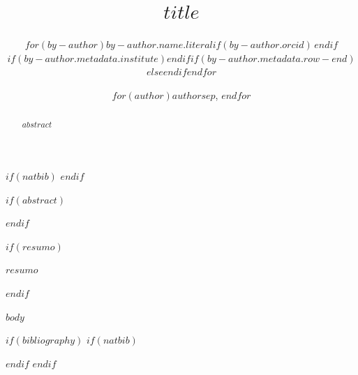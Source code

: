 \documentclass[12pt]{article}
\title{$title$}
\author{$for(by-author)$$by-author.name.literal$$if(by-author.orcid)$\,\orcidlink{$by-author.orcid$}$endif$$if(by-author.metadata.institute)$\inst{$by-author.metadata.institute$}$endif$$if(by-author.metadata.row-end)$\\$else$\quad $endif$$endfor$}
\author{$for(author)$$author$$sep$, $endfor$}
\makeatletter
\let\quartosbcnatbiblbibitem\@lbibitem
\makeatother
\begin{document}
$if(natbib)$
\makeatletter
\let\@lbibitem\quartosbcnatbiblbibitem
\makeatother
$endif$

\maketitle

$if(abstract)$
\begin{abstract}
$abstract$
\end{abstract}
$endif$

$if(resumo)$
\begin{resumo}
$resumo$
\end{resumo}
$endif$

$body$

$if(bibliography)$
$if(natbib)$


$endif$
$endif$
\end{document}
